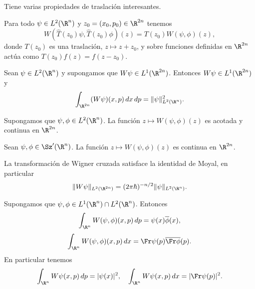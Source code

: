   Tiene varias propiedades de traslación interesantes. 
  \begin{proposition}
    Para todo $\psi \in L^2(\R^{n})$ y $z_0 = (x_0,p_0) \in
    \R^{2n}$ tenemos
    \[
      W(\hat{T}(z_0)\psi, \hat{T}(z_0)\phi)(z)
      = T(z_0)W(\psi,\phi)(z),
    \] 
    donde $T(z_0)$ es una traslación, $z \mapsto z + z_0$, y
    sobre funciones definidas en $\R^{2n}$ actúa como
    $T(z_0)f(z) = f(z-z_0)$.
  \end{proposition}
  
  \begin{proposition}
    Sean $\psi \in L^2(\R^{n})$ y supongamos que $W\psi \in
    L^{1}(\R^{2n})$. Entonces $W\psi \in L^{1}(\R^{2n})$ y
    \begin{equation}
      \int_{\R^{2n}} (W\psi)(x,p) \, dx \, dp 
      = \|\psi\|^2_{L^2(\R^{n})}.
    \end{equation}
  \end{proposition}

  \begin{proposition}
    Supongamos que $\psi, \phi \in L^2(\R^{n})$. La función
    $z \mapsto W(\psi,\phi)(z)$ es acotada y continua en
    $\R^{2n}$.
  \end{proposition}

  \begin{proposition}
    Sean $\psi,\phi \in \Sz'(\R^{n})$. La función $z
    \mapsto W(\psi,\phi)(z)$ es continua en $\R^{2n}$.
  \end{proposition}

  \begin{proposition}
    La transformación de Wigner cruzada satisface la
    identidad de Moyal, en particular
    \begin{equation}
      \|W\psi\|_{L^2(\R^{2n})}
      = (2\pi\hbar)^{-n / 2} \|\psi\|_{L^2(\R^{n})}.
    \end{equation}
  \end{proposition}

  \begin{proposition}
    Supongamos que $\psi, \phi \in L^{1}(\R^{n}) \cap
    L^2(\R^{n})$. Entonces
    \begin{equation}
      \int_{\R^{n}} W(\psi,\phi)(x,p) \, dp
      = \psi(x)\overline{\phi}(x),
    \end{equation}
    \begin{equation}
      \int_{\R^{n}} W(\psi,\phi)(x,p) \, dx
      = \Fr\psi(p) \overline{\Fr\phi}(p).
    \end{equation}
    En particular tenemos
    \begin{equation}
      \int_{\R^{n}} W\psi(x,p) \, dp
      = |\psi(x)|^2,
      \quad
      \int_{\R^{n}} W\psi(x,p) \, dx
      = |\Fr\psi(p)|^2.
    \end{equation}
  \end{proposition}

